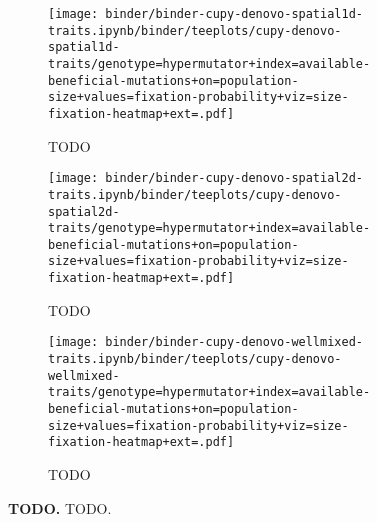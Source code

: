 \begin{sidewaysfigure}[h]
  \rotatesidewayslabel
    \begin{subfigure}[b]{0.33\linewidth}
        \begin{minipage}{\linewidth}
          \texttt{[image: binder/binder-cupy-denovo-spatial1d-traits.ipynb/binder/teeplots/cupy-denovo-spatial1d-traits/genotype=hypermutator+index=available-beneficial-mutations+on=population-size+values=fixation-probability+viz=size-fixation-heatmap+ext=.pdf]}%
        \end{minipage}
        \begin{minipage}{\linewidth}
        \caption{TODO}
        \label{fig:fixheat-denovo-cupy:spatial1d}
        \end{minipage}%
    \end{subfigure}%
    \begin{subfigure}[b]{0.32\linewidth}
        \begin{minipage}{\linewidth}
          \texttt{[image: binder/binder-cupy-denovo-spatial2d-traits.ipynb/binder/teeplots/cupy-denovo-spatial2d-traits/genotype=hypermutator+index=available-beneficial-mutations+on=population-size+values=fixation-probability+viz=size-fixation-heatmap+ext=.pdf]}%
        \end{minipage}
        \begin{minipage}{\linewidth}
        \caption{TODO}
        \label{fig:fixheat-denovo-cupy:spatial2d}
        \end{minipage}%
    \end{subfigure}%
\begin{subfigure}[b]{0.35\linewidth}
    \begin{minipage}{\linewidth}
          \texttt{[image: binder/binder-cupy-denovo-wellmixed-traits.ipynb/binder/teeplots/cupy-denovo-wellmixed-traits/genotype=hypermutator+index=available-beneficial-mutations+on=population-size+values=fixation-probability+viz=size-fixation-heatmap+ext=.pdf]}%
    \end{minipage}
    \begin{minipage}{\linewidth}
    \caption{TODO}
    \label{fig:fixheat-denovo-cupy:wellmixed}
    \end{minipage}%
\end{subfigure}%


  \begin{minipage}{\linewidth}
    \caption{%
      \textbf{TODO.}
      \footnotesize
     TODO.
    }
    \label{fig:fixheat-denovo-cupy}
  \end{minipage}
\end{sidewaysfigure}
